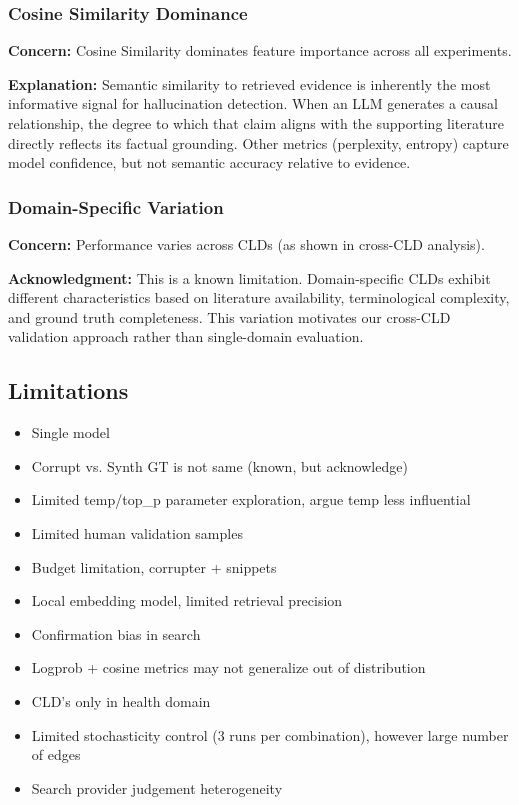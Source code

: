 \subsubsection{Cosine Similarity Dominance}
\textbf{Concern:} Cosine Similarity dominates feature importance across all experiments.

\textbf{Explanation:} Semantic similarity to retrieved evidence is inherently the most informative signal for hallucination detection. When an LLM generates a causal relationship, the degree to which that claim aligns with the supporting literature directly reflects its factual grounding. Other metrics (perplexity, entropy) capture model confidence, but not semantic accuracy relative to evidence.

\subsubsection{Domain-Specific Variation}
\textbf{Concern:} Performance varies across CLDs (as shown in cross-CLD analysis).

\textbf{Acknowledgment:} This is a known limitation. Domain-specific CLDs exhibit different characteristics based on literature availability, terminological complexity, and ground truth completeness. This variation motivates our cross-CLD validation approach rather than single-domain evaluation.

\subsection{Limitations}

\begin{itemize}
    \item Single model
    \item Corrupt vs. Synth GT is not same (known, but acknowledge)
    \item Limited temp/top\_p parameter exploration, argue temp less influential
    \item Limited human validation samples
    \item Budget limitation, corrupter + snippets
    \item Local embedding model, limited retrieval precision
    \item Confirmation bias in search
    \item Logprob + cosine metrics may not generalize out of distribution
    \item CLD's only in health domain
    \item Limited stochasticity control (3 runs per combination), however large number of edges
    \item Search provider judgement heterogeneity
\end{itemize}

